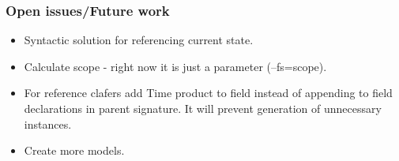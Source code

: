 \documentclass[xcolor=dvipsnames,mathserif,12pt,backend=biber]{beamer}
\begin{document}
  \begin{frame}
    \frametitle{Open issues/Future work}
    \begin{itemize}
      \item Syntactic solution for referencing current state.
      \item Calculate scope - right now it is just a parameter (--fs=scope).
      \item For reference clafers add Time product to  field instead of appending to field declarations in parent signature. It will prevent generation of unnecessary instances.
      \item Create more models.
    \end{itemize}
  \end{frame}
\end{document}
